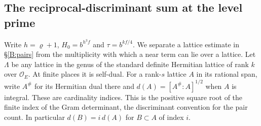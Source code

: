 \subsection{The reciprocal-discriminant sum at the level prime}
\label{app:pair-count}
Write $h=\varrho+1$, $H_0=b^{h^3 f}$ and $\tau=b^{kf/4}$.
We separate a lattice estimate in \S\ref{B:pairs} from the multiplicity
with which a near term can lie over a lattice. Let $\Lambda$ be any lattice
in the genus of the standard definite Hermitian lattice of rank $k$ over
$\mathcal O_E$. At finite places it is self-dual. For a rank-$s$ lattice
$A$ in its rational span, write $A^\#$ for its Hermitian dual there and
$d(A)=[A^\#:A]^{1/2}$ when $A$ is integral. These are cardinality
indices. This is the positive square root of the finite index of the
Gram determinant, the discriminant convention for the pair count. In
particular $d(B)=i\,d(A)$ for $B\subset A$ of index $i$.

